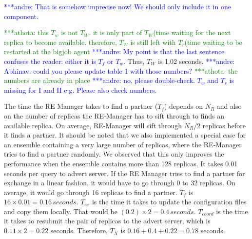 \documentclass{rspublic}
\newcommand{\alnote}[1]{ {\textcolor{blue} { ***andre: #1 }}}
\newcommand{\athotanote}[1]{ {\textcolor{green} { ***athota: #1 }}}
\newcommand{\alnote}[1]{}
\newcommand{\athotanote}[1]{}
\begin{document}
\alnote{That is somehow imprecise now! We should only
include it in one component.} {\athotanote{this $T_w$ is not $T_W$. it 
is only part of $T_W$(time waiting for the next replica to become available. 
therefore, $T_W$ is still left with $T_r$(time waiting to be restarted at the bigjob agent }
\alnote{My point is that the last sentence confuses the reader: either it is $T_f$ or $T_w$.}
Thus, $T_W$ is 1.02 seconds. \alnote{Abhinav: could you please update table 1 with those numbers?} \athotanote{the numbers are already in place}\alnote{no, please double-check. $T_w$ and $T_r$ is 
missing for I and II e.g. Please also check numbers.}

The time the RE Manager takes to find a partner ($T_f$) depends on
$N_R$ and also on the number of replicas the RE-Manager has to sift
through to finds an available replica. On average, RE-Manager will
sift through $N_R/2$ replicas before it finds a partner. %
It should be noted that we also implemented a
special case for an ensemble containing a very large number of
replicas, where the RE-Manager tries to find a partner randomly. We
observed that this only improves the performance when the ensemble
contains more than 128 replicas. It takes 0.01 seconds per
query to advert server. 
If the RE Manager tries to find a partner for exchange in a linear fashion, it would have to go through 0 to 32 replicas. On average, it would go through 16 replicas to find a partner. $T_f$ is $16\times
0.01=0.16\,seconds$. 
$T_{ex}$ is the time it takes to
update the configuration files and copy them locally. That would be
$({0.2})\times 2=0.4\,seconds$. $T_{coord}$ is the time it takes to
resubmit the pair of replicas to the advert server, which is
$0.11\times 2 = 0.22$ seconds. Therefore, $T_{X}$ is
$0.16+0.4+0.22=0.78$ seconds. 



}
\end{document}
